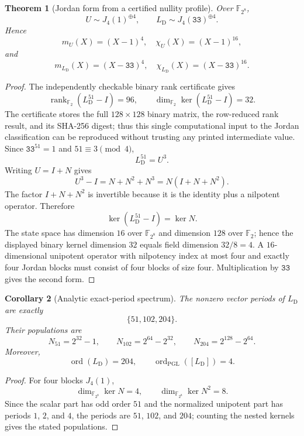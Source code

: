\documentclass[10pt,reqno]{amsart}
\theoremstyle{plain}
\newtheorem{theorem}{Theorem}[section]
\newtheorem{corollary}[theorem]{Corollary}
\theoremstyle{remark}\newtheorem{remark}[theorem]{Remark}
\theoremstyle{definition}\newtheorem{definition}[theorem]{Definition}
\newcommand{\F}{\mathbb F}
\newcommand{\ord}{\operatorname{ord}}
\newcommand{\hex}[1]{\mathtt{#1}}
\begin{document}
\begin{theorem}[Jordan form from a certified nullity profile]\label{thm:WH-jordan}
Over $\F_{2^8}$,
\begin{equation}
U\sim J_4(1)^{\oplus4},
\qquad
L_{\mathrm{D}}\sim J_4(\hex{33})^{\oplus4}.
\label{eq:WH-jordan}
\end{equation}
Hence
\[
m_U(X)=(X-1)^4,\quad \chi_U(X)=(X-1)^{16},
\]
and
\[
m_{L_{\mathrm{D}}}(X)=(X-\hex{33})^4,\quad
\chi_{L_{\mathrm{D}}}(X)=(X-\hex{33})^{16}.
\]
\end{theorem}
\begin{proof}
The independently checkable binary rank certificate gives
\[
\operatorname{rank}_{\F_2}(L_{\mathrm{D}}^{51}-I)=96,
\qquad
\dim_{\F_2}\ker(L_{\mathrm{D}}^{51}-I)=32.
\]
The certificate stores the full $128\times128$ binary matrix, the row-reduced rank result, and its SHA-256 digest; thus this single computational input to the Jordan classification can be reproduced without trusting any printed intermediate value.
Since $\hex{33}^{51}=1$ and $51\equiv3\pmod4$,
\[
L_{\mathrm{D}}^{51}=U^3.
\]
Writing $U=I+N$ gives
\[
U^3-I=N+N^2+N^3=N(I+N+N^2).
\]
The factor $I+N+N^2$ is invertible because it is the identity plus a nilpotent operator. Therefore
\[
\ker(L_{\mathrm{D}}^{51}-I)=\ker N.
\]
The state space has dimension $16$ over $\F_{2^8}$ and dimension $128$ over $\F_2$; hence the displayed binary kernel dimension $32$ equals field dimension $32/8=4$. A $16$-dimensional unipotent operator with nilpotency index at most four and exactly four Jordan blocks must consist of four blocks of size four. Multiplication by $\hex{33}$ gives the second form.
\end{proof}

\begin{corollary}[Analytic exact-period spectrum]\label{thm:WHspectrum}
The nonzero vector periods of $L_{\mathrm{D}}$ are exactly
\[
\{51,102,204\}.
\]
Their populations are
\[
N_{51}=2^{32}-1,\qquad
N_{102}=2^{64}-2^{32},\qquad
N_{204}=2^{128}-2^{64}.
\]
Moreover,
\[
\ord(L_{\mathrm{D}})=204,
\qquad
\ord_{\mathrm{PGL}}([L_{\mathrm{D}}])=4.
\]
\end{corollary}
\begin{proof}
For four blocks $J_4(1)$,
\[
\dim_{\F_{2^8}}\ker N=4,
\qquad
\dim_{\F_{2^8}}\ker N^2=8.
\]
Since the scalar part has odd order $51$ and the normalized unipotent part has periods $1$, $2$, and $4$, the periods are $51$, $102$, and $204$; counting the nested kernels gives the stated populations.
\end{proof}
\end{document}
